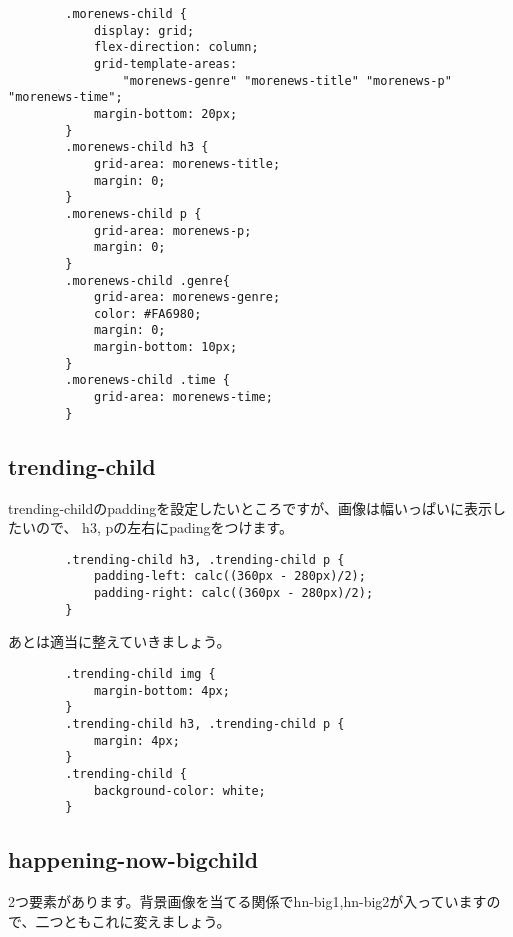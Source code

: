 \documentclass[mingoth,11pt,a4j,uplatex,dvipdfmx]{jsarticle}
\begin{document}
\begin{lstlisting}
        .morenews-child {
            display: grid;
            flex-direction: column;
            grid-template-areas:
                "morenews-genre" "morenews-title" "morenews-p" "morenews-time";
            margin-bottom: 20px;
        }
        .morenews-child h3 {
            grid-area: morenews-title;
            margin: 0;
        }
        .morenews-child p {
            grid-area: morenews-p;
            margin: 0;
        }
        .morenews-child .genre{
            grid-area: morenews-genre;
            color: #FA6980;
            margin: 0;
            margin-bottom: 10px;
        }
        .morenews-child .time {
            grid-area: morenews-time;
        }
\end{lstlisting}

\subsection{trending-child}
trending-childのpaddingを設定したいところですが、画像は幅いっぱいに表示したいので、
h3, pの左右にpadingをつけます。

\begin{lstlisting}
        .trending-child h3, .trending-child p {
            padding-left: calc((360px - 280px)/2);
            padding-right: calc((360px - 280px)/2);
        }
\end{lstlisting}

あとは適当に整えていきましょう。

\begin{lstlisting}
        .trending-child img {
            margin-bottom: 4px;
        }
        .trending-child h3, .trending-child p {
            margin: 4px;
        }
        .trending-child {
            background-color: white;
        }
\end{lstlisting}

\subsection{happening-now-bigchild}

2つ要素があります。背景画像を当てる関係でhn-big1,hn-big2が入っていますので、二つともこれに変えましょう。
\end{document}
